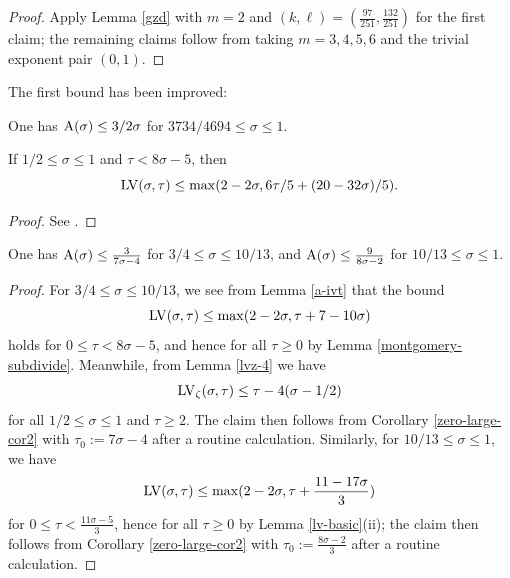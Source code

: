 \begin{proof} Apply Lemma \ref{gzd} with $m=2$ and $(k,\ell) = (\frac{97}{251}, \frac{132}{251})$ for the first claim; the remaining claims follow from taking $m=3, 4, 5, 6$ and the trivial exponent pair $(0, 1)$.
\end{proof}

The first bound has been improved:

\begin{theorem}\label{bourgain-zero-density-2000}\cite{bourgain_dirichlet_2000} One has $\mathrm{A}(\sigma) \leq 3/2\sigma$ for $3734/4694 \leq \sigma \leq 1$.
\end{theorem}
\literature
{}

\begin{lemma}\label{a-ivt}  If $1/2 \leq \sigma \leq 1$ and $\tau < 8\sigma-5$, then
    $$ \mathrm{LV}(\sigma,\tau) \leq \max( 2-2\sigma, 6\tau/5 + (20-32\sigma)/5 ).$$
\end{lemma}

\begin{proof} See \cite[(11.95)]{ivic}.
\end{proof}

\begin{corollary}\label{ivic-near-34}\cite[Theorem 11.5]{ivic}  One has $\mathrm{A}(\sigma) \leq \frac{3}{7\sigma-4}$ for $3/4 \leq \sigma \leq 10/13$, and $\mathrm{A}(\sigma) \leq \frac{9}{8\sigma-2}$ for $10/13 \leq \sigma \leq 1$.
\end{corollary}

\begin{proof}  For $3/4 \leq \sigma \leq 10/13$, we see from Lemma \ref{a-ivt} that the bound
$$ \mathrm{LV}(\sigma,\tau) \leq \max(2-2\sigma, \tau + 7 - 10\sigma )$$
holds for $0 \leq \tau < 8\sigma-5$, and hence for all $\tau \geq 0$ by Lemma \ref{montgomery-subdivide}.  Meanwhile, from Lemma \ref{lvz-4} we have
$$\mathrm{LV}_\zeta(\sigma,\tau) \leq \tau - 4 (\sigma-1/2)$$
for all $1/2 \leq \sigma \leq 1$ and $\tau \geq 2$. The claim then follows from Corollary
\ref{zero-large-cor2} with $\tau_0 := 7\sigma-4$ after a routine calculation.  Similarly, for $10/13 \leq \sigma \leq 1$, we have
$$ \mathrm{LV}(\sigma,\tau) \leq \max(2-2\sigma, \tau + \frac{11 - 17 \sigma}{3} )$$
for $0 \leq \tau < \frac{11\sigma-5}{3}$, hence for all $\tau \geq 0$ by Lemma \ref{lv-basic}(ii); the claim then follows from Corollary
\ref{zero-large-cor2} with $\tau_0 := \frac{8\sigma-2}{3}$ after a routine calculation.
\end{proof}


